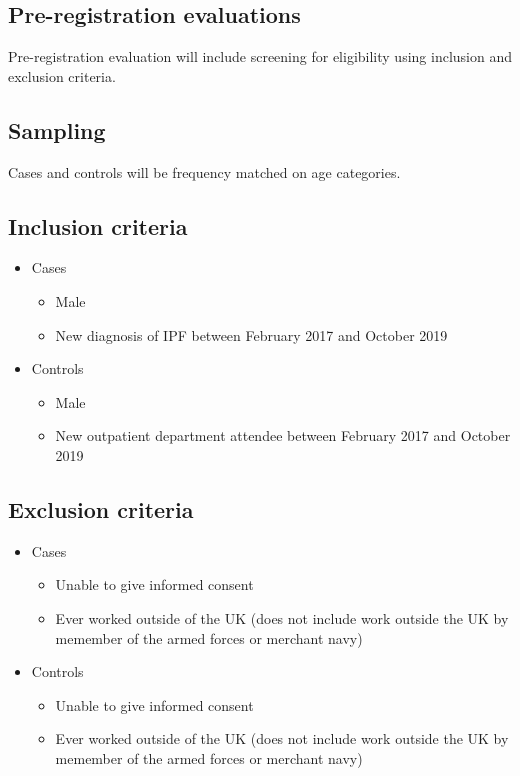 \documentclass[a4paper,10pt]{article}
\newcommand{\studystart}{February 2017 }
\newcommand{\studyend}{October 2019 }
\begin{document}
\subsection{Pre-registration evaluations}
Pre-registration evaluation will include screening for eligibility using inclusion and exclusion criteria.

\subsection{Sampling}
Cases and controls will be frequency matched on age categories.

\subsection{Inclusion criteria}
\begin{itemize}
 \item Cases \begin{itemize}
        \item Male
        \item New diagnosis of IPF between \studystart and \studyend 
       \end{itemize}
       
  \item Controls \begin{itemize}
        \item Male
        \item New outpatient department attendee between \studystart and \studyend
       \end{itemize}

\end{itemize}


\subsection{Exclusion criteria}
\begin{itemize}
 \item Cases \begin{itemize}
        \item Unable to give informed consent
        \item Ever worked outside of the UK (does not include work outside the UK by memember of the armed forces or merchant navy)
       \end{itemize}
       
  \item Controls \begin{itemize}
        \item Unable to give informed consent
        \item Ever worked outside of the UK (does not include work outside the UK by memember of the armed forces or merchant navy)
       \end{itemize}

\end{itemize}
\end{document}
